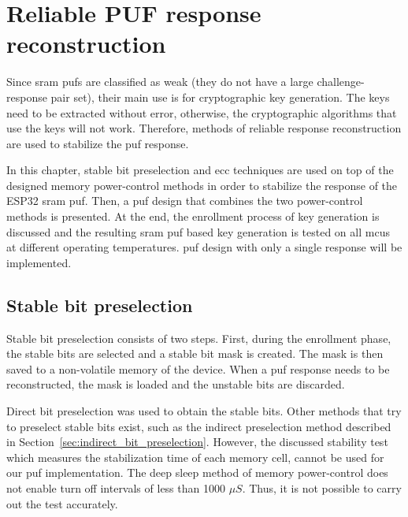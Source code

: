 \chapter{Reliable PUF response reconstruction}\label{sec:response_extraction}

Since \gls{sram} \glspl{puf} are classified as weak (they do not have a large challenge-response pair set), their main use is for cryptographic key generation. The keys need to be extracted without error, otherwise, the cryptographic algorithms that use the keys will not work. Therefore, methods of reliable response reconstruction are used to stabilize the \gls{puf} response.

In this chapter, stable bit preselection and \gls{ecc} techniques are used on top of the designed memory power-control methods in order to stabilize the response of the ESP32 \gls{sram} \gls{puf}. Then, a \gls{puf} design that combines the two power-control methods is presented. At the end, the enrollment process of key generation is discussed and the resulting \gls{sram} \gls{puf} based key generation is tested on all \glspl{mcu} at different operating temperatures. \gls{puf} design with only a single response will be implemented.

\section{Stable bit preselection}

Stable bit preselection consists of two steps. First, during the enrollment phase, the stable bits are selected and a stable bit mask is created. The mask is then saved to a non-volatile memory of the device. When a \gls{puf} response needs to be reconstructed, the mask is loaded and the unstable bits are discarded.

Direct bit preselection was used to obtain the stable bits. Other methods that try to preselect stable bits exist, such as the indirect preselection method described in Section~\ref{sec:indirect_bit_preselection}. However, the discussed stability test which measures the stabilization time of each memory cell, cannot be used for our \gls{puf} implementation. The deep sleep method of memory power-control does not enable turn off intervals of less than 1000 $\mu{}S$. Thus, it is not possible to carry out the test accurately.

